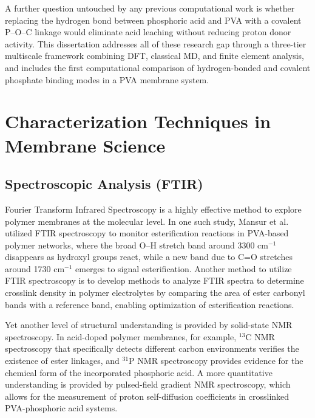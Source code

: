 \documentclass[12pt,a4paper]{report}
\begin{document}
A further question untouched by any previous computational 
work is whether replacing the hydrogen bond between 
phosphoric acid and PVA with a covalent P--O--C linkage 
would eliminate acid leaching without reducing proton donor 
activity. This dissertation addresses all of these research gap 
through a three-tier multiscale framework combining DFT, 
classical MD, and finite element analysis, and includes 
the first computational comparison of hydrogen-bonded and 
covalent phosphate binding modes in a PVA membrane 
system.\cite{18,19}



\section{Characterization Techniques in Membrane Science}
\subsection{Spectroscopic Analysis (FTIR)}
Fourier Transform Infrared Spectroscopy is a highly effective method to explore polymer membranes at the molecular level. In one such study, Mansur et al. utilized FTIR spectroscopy to monitor esterification reactions in PVA-based polymer networks, where the broad O–H stretch band around 3300 cm\(^{-1}\) disappears as hydroxyl groups react, while a new band due to C=O stretches around 1730 cm\(^{-1}\) emerges to signal esterification. Another method to utilize FTIR spectroscopy is to develop methods to analyze FTIR spectra to determine crosslink density in polymer electrolytes by comparing the area of ester carbonyl bands with a reference band, enabling optimization of esterification reactions.\cite{52}

Yet another level of structural understanding is provided by solid-state NMR spectroscopy. In acid-doped polymer membranes, for example, \(^{13}\)C NMR spectroscopy that specifically detects different carbon environments verifies the existence of ester linkages, and \(^{31}\)P NMR spectroscopy provides evidence for the chemical form of the incorporated phosphoric acid.\cite{52,59} A more quantitative understanding is provided by pulsed-field gradient NMR spectroscopy, which allows for the measurement of proton self-diffusion coefficients in crosslinked PVA-phosphoric acid systems.\cite{60}
\end{document}
